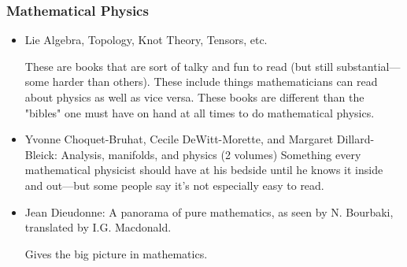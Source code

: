 \documentclass[10pt,a4paper]{book}
\theoremstyle{definition}
\begin{document}
\subsubsection{Mathematical Physics}
\begin{itemize}
\item 
Lie Algebra, Topology, Knot Theory, Tensors, etc.

These are books that are sort of talky and fun to read (but still substantial—some harder than others).  These include things mathematicians can read about physics as well as vice versa.  These books are different than the "bibles" one must have on hand at all times to do mathematical physics.

\item Yvonne Choquet-Bruhat, Cecile DeWitt-Morette, and Margaret Dillard-Bleick: Analysis, manifolds, and physics (2 volumes)
Something every mathematical physicist should have at his bedside until he knows it inside and out—but some people say it's not especially easy to read.
\item Jean Dieudonne: A panorama of pure mathematics, as seen by N. Bourbaki, translated by I.G. Macdonald.

Gives the big picture in mathematics.


\end{itemize}
\end{document}
